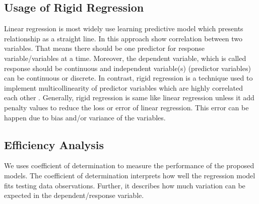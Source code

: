 \subsection{Usage of Rigid Regression}

Linear regression is most widely use learning predictive model 
which presents relationship as a straight line.
In this approach show correlation between two variables.
That means there should be one predictor for response variable/variables at a time.
Moreover, the dependent variable, which is called 
response should be continuous and independent 
variable(s) (predictor variables) can be continuous or discrete. 
In contrast, rigid regression is a technique used 
to implement multicollinearity of predictor variables 
which are highly correlated each other \cite{dong2016moving}.
Generally, rigid regression is same like 
linear regression unless it add penalty values 
to reduce the loss or error of linear regression.
This error can  be happen due to bias and/or variance of the variables.

\subsection{Efficiency Analysis}
We uses coefficient of determination to measure the performance of the proposed models. 
The coefficient of determination interprets 
how well the regression model fits testing data observations.
Further, it describes how much variation 
can be expected in the dependent/response variable.

